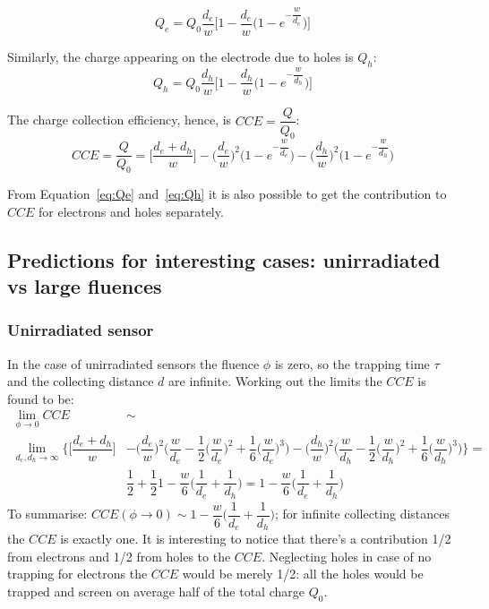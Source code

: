 \begin{equation}
Q_e=Q_0\dfrac{d_e}{w}\Big[1-\dfrac{d_e}{w}\Big(1-e^{-\dfrac{w}{d_e}}\Big)\Big]
\label{eq:Qe}
\end{equation}

Similarly, the charge appearing on the electrode due to holes is $Q_h$:
\begin{equation}
Q_h=Q_0\dfrac{d_h}{w}\Big[1-\dfrac{d_h}{w}\Big(1-e^{-\dfrac{w}{d_h}}\Big)\Big]
\label{eq:Qh}
\end{equation}

The charge collection efficiency, hence, is  $CCE=\dfrac{Q}{Q_0}$:
\begin{equation}
CCE=\dfrac{Q}{Q_0}=\Big[\dfrac{d_e+d_h}{w}\Big]-\Big(\dfrac{d_e}{w}\Big)^2\Big(1-e^{-\dfrac{w}{d_e}}\Big)-\Big(\dfrac{d_h}{w}\Big)^2\Big(1-e^{-\dfrac{w}{d_h}}\Big)
\label{eq:CCE}
\end{equation}

From Equation~\ref{eq:Qe} and~\ref{eq:Qh} it is also possible to get the contribution to $CCE$ 
for electrons and holes separately. 

\subsection{Predictions for interesting cases: unirradiated vs large fluences}

\subsubsection{Unirradiated sensor}

In the case of unirradiated sensors the fluence $\phi$ is zero, so the trapping time $\tau$ and the 
collecting distance $d$ are infinite. Working out the limits the $CCE$ is found to be:
\begin{equation}
\begin{split}
\lim_{\phi \to 0}CCE & \sim \\ \lim_{d_e,d_h\to \infty}   \Big\{\Big[\dfrac{d_e+d_h}{w}\Big]&-\Big(\dfrac{d_e}{w}\Big)^2\Big(\dfrac{w}{d_e}-\dfrac{1}{2}\big(\dfrac{w}{d_e}\big)^2+\dfrac{1}{6}\big(\dfrac{w}{d_e}\big)^3\Big)-\Big(\dfrac{d_h}{w}\Big)^2\Big(\dfrac{w}{d_h}-\dfrac{1}{2}\big(\dfrac{w}{d_h}\big)^2+\dfrac{1}{6}\big(\dfrac{w}{d_h}\big)^3\Big)\Big\}=\\
&\dfrac{1}{2}+\dfrac{1}{2}1-\dfrac{w}{6}\Big(\dfrac{1}{d_e}+\dfrac{1}{d_h}\Big)=1-\dfrac{w}{6}\Big(\dfrac{1}{d_e}+\dfrac{1}{d_h}\Big)
\end{split}
\label{eq:CCE_unirr}
\end{equation}
To summarise: $CCE(\phi\to 0)\sim1-\dfrac{w}{6}\Big(\dfrac{1}{d_e}+\dfrac{1}{d_h}\Big)$; for infinite 
collecting distances the $CCE$ is exactly one. 
It is interesting to notice that there's a contribution 1/2 from electrons and 1/2 from holes to the 
$CCE$. Neglecting holes in case of no  trapping for electrons the $CCE$  would be merely 1/2: 
all the holes would be trapped and screen on average half of the total charge $Q_0$.

